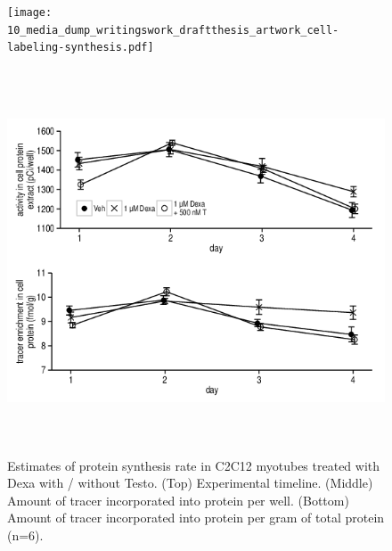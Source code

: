 \documentclass[12pt,english]{report}\usepackage[]{graphicx}\usepackage[]{color}
\newenvironment{knitrout}{}{} %
\begin{document}
\begin{figure}
\begin{minipage}[t][3.3in]{6in}%
\texttt{[image: 10\_media\_dump\_writingswork\_draftthesis\_artwork\_cell-labeling-synthesis.pdf]}%
\end{minipage}

\begin{minipage}[t][4.5in][c]{6in}%
\begin{knitrout}
\color{fgcolor}
\includegraphics[width=6in,height=4.5in]{figure/proteinsynthesis-1} 

\end{knitrout}
%
\end{minipage} 

\protect\caption[Estimates of protein synthesis rate in C2C12 myotubes treated with
Dexa with / without Testo.]{Estimates of protein synthesis rate in C2C12 myotubes treated with
Dexa with / without Testo. (Top) Experimental timeline. (Middle) Amount
of tracer incorporated into protein per well. (Bottom) Amount of tracer
incorporated into protein per gram of total protein (n=6). \label{fig:protein-synthesis-cells}}
\end{figure}
\end{document}
